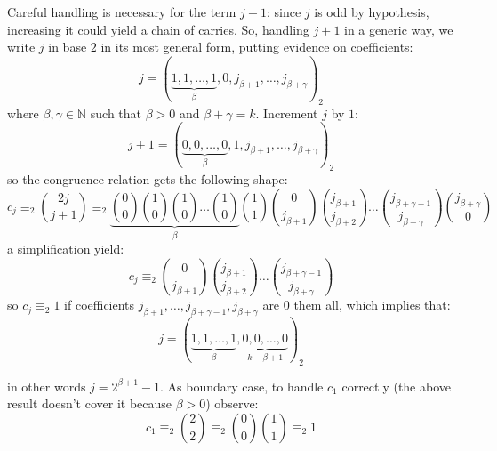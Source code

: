 \begin{itemize}
        Careful handling is necessary for the term $j+1$: 
        since $j$ is odd by hypothesis, increasing it could yield a chain of carries.
        So, handling $j+1$ in a generic way, we write
        $j$ in base $2$ in its most general form, putting evidence on coefficients:
        \begin{displaymath}
            j=\left(\underbrace{1,1,\ldots,1}_{\beta},0,j_{\beta+1},\ldots,j_{\beta+\gamma}\right)_{2}
        \end{displaymath}
        where $\beta,\gamma\in\mathbb{N}$ such that $\beta>0$ and $\beta+\gamma=k$. 
        Increment $j$ by $1$:
        \begin{displaymath}
            j+1=\left(\underbrace{0,0,\ldots,0}_{\beta},1,j_{\beta+1},\ldots,j_{\beta+\gamma}%
                \right)_{2}
        \end{displaymath}
        so the congruence relation gets the following shape:
        \begin{displaymath}
            c_{j}\equiv_{2}{{2j}\choose{j+1}}
                \equiv_{2} \underbrace{{{0}\choose{0}}{{1}\choose{0}}
                {{1}\choose{0}}\ldots{{1}\choose{0}}}_{\beta} 
                    {{1}\choose{1}}{{0}\choose{j_{\beta+1}}}{{j_{\beta+1}}\choose{j_{\beta+2}}}
                    \ldots{{j_{\beta+\gamma-1}}\choose{j_{\beta+\gamma}}}{{j_{\beta+\gamma}}\choose{0}}%
        \end{displaymath}
        a simplification yield:
        \begin{displaymath}
            c_{j}\equiv_{2} {{0}\choose{j_{\beta+1}}}
                {{j_{\beta+1}}\choose{j_{\beta+2}}}
                    \ldots{{j_{\beta+\gamma-1}}\choose{j_{\beta+\gamma}}}
        \end{displaymath}
        so $c_{j}\equiv_{2} 1$ if coefficients 
            $j_{\beta+1}, \ldots, j_{\beta+\gamma-1},j_{\beta+\gamma}$
        are $0$ them all, which implies that:
        \begin{displaymath}
            j=\left(\underbrace{1,1,\ldots,1}_{\beta},\underbrace{0,0,\ldots,0}_{k-\beta+1}\right)_{2}
        \end{displaymath}

        in other words $j = 2^{\beta+1}-1$. As boundary case, to handle $c_{1}$ correctly 
        (the above result doesn't cover it because $\beta>0$) observe:
        \begin{displaymath}
            c_{1}\equiv_{2} {{2}\choose{2}}\equiv_{2} {{0}\choose{0}}{{1}\choose{1}}\equiv_{2}1
        \end{displaymath}
\end{itemize}

